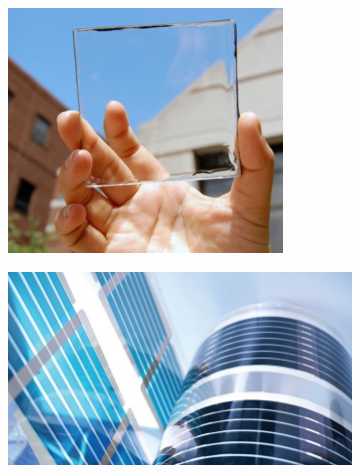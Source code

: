 \begin{figure}[h]
    \centering
    
    \begin{subfigure}[t]{0.43\textwidth}
        \centering
        \includegraphics[width=0.8\textwidth]{pictures/transparent_solar.PNG}
        \caption{}
    \end{subfigure}
    \hspace{0.5cm}
    \begin{subfigure}[t]{.43\textwidth}
        \centering
        \includegraphics[width=\textwidth]{pictures/flexible_opv.jpg}
        \caption{}
    \end{subfigure}
    
    
    \vspace{0.2cm}
    

\end{figure}
